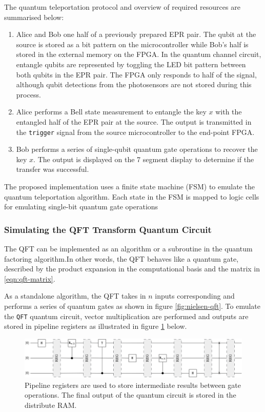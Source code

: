 The quantum teleportation protocol and overview of required resources are summarised below:
\begin{enumerate}
	\item
	Alice and Bob one half of a previously prepared EPR pair. The qubit at the source is stored as a bit pattern on the microcontroller while Bob's half is stored in the external memory on the FPGA. In the quantum channel circuit, entangle qubits are represented by toggling the LED bit pattern between both qubits in the EPR pair. The FPGA only responds to half of the signal, although qubit detections from the photosensors are not stored during this process.
	\item 
	Alice performs a Bell state measurement to entangle the key $x$ with the entangled half of the EPR pair at the source. The output is transmitted in the \texttt{trigger} signal from the source microcontroller to the end-point FPGA.
	\item 
	Bob performs a series of single-qubit quantum gate operations to recover the key $x$. The output is displayed on the 7 segment display to determine if the transfer was successful.
\end{enumerate}

The proposed implementation uses a finite state machine (FSM) to emulate the quantum teleportation algorithm. Each state in the FSM is mapped to logic cells for emulating single-bit quantum gate operations 
\subsubsection{Simulating the QFT Transform Quantum Circuit}

The QFT can be implemented as an algorithm or a subroutine in the quantum factoring algorithm.In other words, the QFT behaves like a quantum gate, described by the product expansion in the computational basis and the matrix in \ref{eqn:qft-matrix}. 

As a standalone algorithm, the QFT takes in $n$ inputs corresponding and performs a series of quantum gates as shown in figure \ref{fig:nielsen-qft}. To emulate the \texttt{QFT} quantum circuit, vector multiplication are performed and outputs are stored in pipeline registers as illustrated in figure \ref{fig:qft-pipeline} below.
\begin{figure}[!ht]
	\centering
	\includegraphics[width=1.0\linewidth]{body/ch4/figs/qft-pipeline}
	\caption[Illustrating the Implementation of DSP Pipeline Registers for Performing the QFT in the QAES.]{Pipeline registers are used to store intermediate results between gate operations. The final output of the quantum circuit is stored in the distribute RAM.}
	\label{fig:qft-pipeline}
\end{figure}

